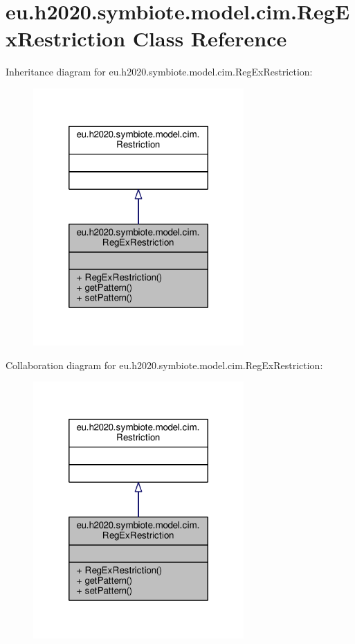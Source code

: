\hypertarget{classeu_1_1h2020_1_1symbiote_1_1model_1_1cim_1_1RegExRestriction}{}\section{eu.\+h2020.\+symbiote.\+model.\+cim.\+Reg\+Ex\+Restriction Class Reference}
\label{classeu_1_1h2020_1_1symbiote_1_1model_1_1cim_1_1RegExRestriction}


Inheritance diagram for eu.\+h2020.\+symbiote.\+model.\+cim.\+Reg\+Ex\+Restriction\+:\nopagebreak
\begin{figure}[H]
\begin{center}
\leavevmode
\includegraphics[width=228pt]{classeu_1_1h2020_1_1symbiote_1_1model_1_1cim_1_1RegExRestriction__inherit__graph}
\end{center}
\end{figure}


Collaboration diagram for eu.\+h2020.\+symbiote.\+model.\+cim.\+Reg\+Ex\+Restriction\+:\nopagebreak
\begin{figure}[H]
\begin{center}
\leavevmode
\includegraphics[width=228pt]{classeu_1_1h2020_1_1symbiote_1_1model_1_1cim_1_1RegExRestriction__coll__graph}
\end{center}
\end{figure}
